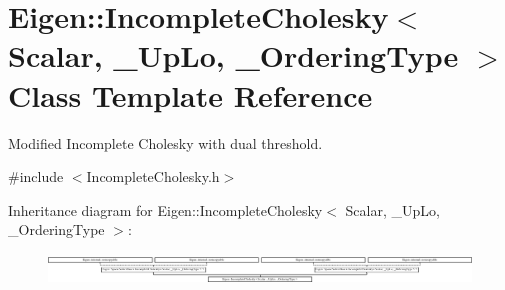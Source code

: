 \hypertarget{class_eigen_1_1_incomplete_cholesky}{}\section{Eigen\+:\+:Incomplete\+Cholesky$<$ Scalar, \+\_\+\+Up\+Lo, \+\_\+\+Ordering\+Type $>$ Class Template Reference}
\label{class_eigen_1_1_incomplete_cholesky}


Modified Incomplete Cholesky with dual threshold.  




{\ttfamily \#include $<$Incomplete\+Cholesky.\+h$>$}

Inheritance diagram for Eigen\+:\+:Incomplete\+Cholesky$<$ Scalar, \+\_\+\+Up\+Lo, \+\_\+\+Ordering\+Type $>$\+:\begin{figure}[H]
\begin{center}
\leavevmode
\includegraphics[height=0.840000cm]{class_eigen_1_1_incomplete_cholesky}
\end{center}
\end{figure}

